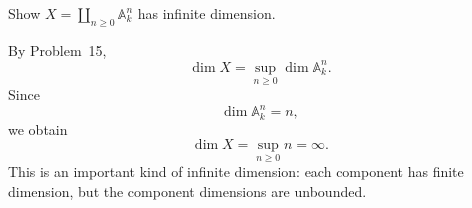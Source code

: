 \begin{problem}\label{prob:vi30-16}
Show \(X=\coprod_{n\ge0}\mathbb A^n_k\) has infinite dimension.

\end{problem}

\ifdefined\FullProblemDossiers
\begin{solution}
By Problem~15,
\[
\dim X
=
\sup_{n\ge0}\dim\mathbb A^n_k.
\]
Since
\[
\dim\mathbb A^n_k=n,
\]
we obtain
\[
\dim X=\sup_{n\ge0}n=\boxed{\infty}.
\]
This is an important kind of infinite dimension: each component has finite dimension, but the component dimensions
are unbounded.
\end{solution}
\fi
